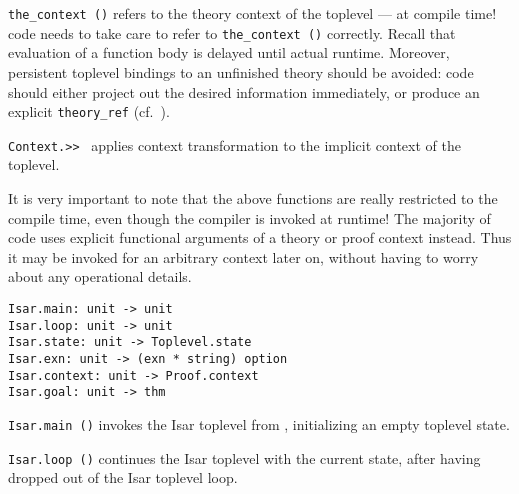 \begin{isabellebody}
\begin{isamarkuptext}
\begin{description}
  \item \verb|the_context ()| refers to the theory context of the
  {\ML} toplevel --- at compile time!  {\ML} code needs to take care
  to refer to \verb|the_context ()| correctly.  Recall that
  evaluation of a function body is delayed until actual runtime.
  Moreover, persistent {\ML} toplevel bindings to an unfinished theory
  should be avoided: code should either project out the desired
  information immediately, or produce an explicit \verb|theory_ref| (cf.\ ).

  \item \verb|Context.>>|~ applies context transformation
   to the implicit context of the {\ML} toplevel.

  \end{description}

  It is very important to note that the above functions are really
  restricted to the compile time, even though the {\ML} compiler is
  invoked at runtime!  The majority of {\ML} code uses explicit
  functional arguments of a theory or proof context instead.  Thus it
  may be invoked for an arbitrary context later on, without having to
  worry about any operational details.

  \bigskip

  \begin{mldecls}
  \verb|Isar.main: unit -> unit| \\
  \verb|Isar.loop: unit -> unit| \\
  \verb|Isar.state: unit -> Toplevel.state| \\
  \verb|Isar.exn: unit -> (exn * string) option| \\
  \verb|Isar.context: unit -> Proof.context| \\
  \verb|Isar.goal: unit -> thm| \\
  \end{mldecls}

  \begin{description}

  \item \verb|Isar.main ()| invokes the Isar toplevel from {\ML},
  initializing an empty toplevel state.

  \item \verb|Isar.loop ()| continues the Isar toplevel with the
  current state, after having dropped out of the Isar toplevel loop.


\end{description}
\end{isamarkuptext}
\end{isabellebody}
